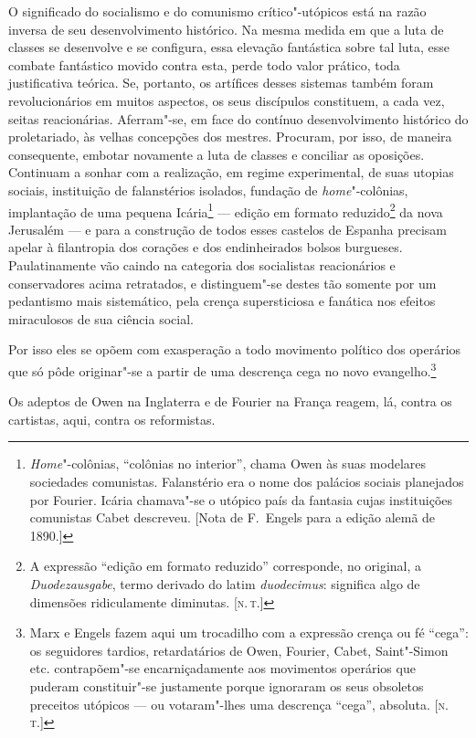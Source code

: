 O significado do socialismo e do comunismo crítico"-utópicos
está na razão inversa de seu desenvolvimento histórico. Na mesma medida
em que a luta de classes se desenvolve e se configura, essa elevação
fantástica sobre tal luta, esse combate fantástico movido contra esta,
perde todo valor prático, toda justificativa teórica. Se, portanto, os
artífices desses sistemas também foram revolucionários em muitos
aspectos, os seus discípulos constituem, a cada vez, seitas reacionárias.
Aferram"-se, em face do contínuo desenvolvimento histórico do
proletariado, às velhas concepções dos mestres. Procuram, por isso, de
maneira consequente, embotar novamente a luta de classes e conciliar as
oposições. Continuam a sonhar com a realização, em regime experimental,
de suas utopias sociais, instituição de falanstérios isolados, fundação
de \textit{home}"-colônias, implantação de uma pequena
Icária\footnote{\textit{Home}"-colônias, ``colônias no
interior'', chama Owen às suas modelares sociedades comunistas.
Falanstério era o nome dos palácios sociais planejados por Fourier.
Icária chamava"-se o utópico país da fantasia cujas instituições
comunistas Cabet descreveu. [Nota de F.~Engels para a edição alemã de
1890.]} --- edição em formato reduzido\footnote{ A expressão ``edição em formato reduzido'' corresponde, no original, a \textit{Duodezausgabe}, termo derivado do
latim \textit{duodecimus}: significa algo de dimensões ridiculamente
diminutas. [\textsc{n.\,t.}]} da nova Jerusalém  ---  e para a construção de todos esses 
castelos de Espanha precisam apelar à filantropia dos corações e dos
endinheirados bolsos burgueses. Paulatinamente vão caindo na categoria
dos socialistas reacionários e conservadores acima retratados, e
distinguem"-se destes tão somente por um pedantismo mais sistemático,
pela crença supersticiosa e fanática nos efeitos miraculosos de sua
ciência social.

Por isso eles se opõem com exasperação a todo movimento político
dos operários que só pôde originar"-se a partir de uma descrença cega
no novo evangelho.\footnote{ Marx e Engels fazem aqui um trocadilho com a expressão crença ou fé ``cega'': os seguidores tardios, retardatários de Owen, 
Fourier, Cabet, Saint"-Simon etc. contrapõem"-se encarniçadamente aos movimentos 
operários que puderam constituir"-se justamente porque ignoraram 
os seus obsoletos preceitos utópicos  ---  ou votaram"-lhes uma descrença 
``cega'', absoluta. [\textsc{n.\,t.}]}

Os adeptos de Owen na Inglaterra e de Fourier na França reagem, lá,
contra os cartistas, aqui, contra os reformistas.

